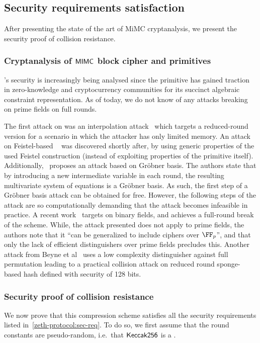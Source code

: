 \subsection{Security requirements satisfaction}\label{instantiation:mkhash:security}

After presenting the state of the art of MiMC cryptanalysis, we present the security proof of \mimcMPPrime{} collision resistance.

\subsubsection{Cryptanalysis of $\mathsf{MIMC{}}$ block cipher and primitives}\label{instantiation:mkhash:security:cryptanalysis}

\mimc{}'s security is increasingly being analysed since the primitive has gained traction in zero-knowledge and cryptocurrency communities for its succinct algebraic constraint representation. As of today, we do not know of any attacks breaking \mimc{} on prime fields on full rounds.

The first attack on \mimc{} was an interpolation attack~\cite{li2019improved} which targets a reduced-round version for a scenario in which the attacker has only limited memory.
An attack on Feistel-based \mimc{}~\cite{bonnetain2019collisions} was discovered shortly after, by using generic properties of the used Feistel construction (instead of exploiting properties of the primitive itself).
Additionally,~\cite{albrecht2019algebraic} proposes an attack based on Gr\"{o}bner basis. The authors state that by introducing a new intermediate variable in each round, the resulting multivariate system of equations is a Gr\"{o}bner basis. As such, the first step of a Gr\"{o}bner basis attack can be obtained for free. However, the following steps of the attack are so computationally demanding that the attack becomes infeasible in practice.
A recent work~\cite{cryptoeprint:2020:182} targets \mimc{} on binary fields, and achieves a full-round break of the scheme. While, the attack presented does not apply to prime fields, the authors note that it ``can be generalized to include ciphers over $\FFx{p}$'', and that only the lack of efficient distinguishers over prime fields precludes this.
Another attack from Beyne et al~\cite{cryptoeprint:2020:188} uses a low complexity distinguisher against full \mimc{} permutation leading to a practical collision attack on reduced round sponge-based \mimc{} hash defined with security of 128 bits.

\subsubsection{Security proof of \mimcMPPrime{} collision resistance}\label{instantiation:mkhash:security:colres-proof}
We now prove that this compression scheme satisfies all the security requirements listed in~\cref{zeth-protocol:sec-req}. To do so, we first assume that the round constants are pseudo-random, i.e.~that $\mathsf{Keccak{256}}$ is a \prf{}.

